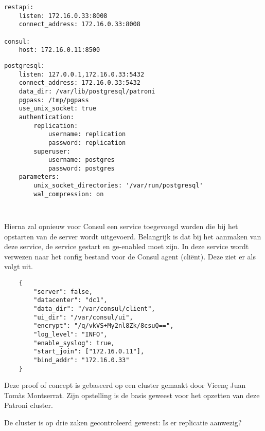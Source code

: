 \begin{lstlisting}
restapi:
    listen: 172.16.0.33:8008
    connect_address: 172.16.0.33:8008

consul:
    host: 172.16.0.11:8500
\end{lstlisting}

\begin{lstlisting}
postgresql:
    listen: 127.0.0.1,172.16.0.33:5432
    connect_address: 172.16.0.33:5432
    data_dir: /var/lib/postgresql/patroni
    pgpass: /tmp/pgpass
    use_unix_socket: true
    authentication:
        replication:
            username: replication
            password: replication
        superuser:
            username: postgres
            password: postgres
    parameters:
        unix_socket_directories: '/var/run/postgresql'
        wal_compression: on
\end{lstlisting}


\begin{lstlisting}
    
\end{lstlisting}




Hierna zal opnieuw voor Consul een service toegevoegd worden die bij het opstarten van de server wordt uitgevoerd. Belangrijk is dat bij het aanmaken van deze service, de service gestart en ge-enabled moet zijn. In deze service wordt verwezen naar het config bestand voor de Consul agent (cliënt). Deze ziet er als volgt uit.

\begin{lstlisting}
    {
        "server": false,
        "datacenter": "dc1",
        "data_dir": "/var/consul/client",
        "ui_dir": "/var/consul/ui",
        "encrypt": "/q/vkVS+My2nl8Zk/8csuQ==", 
        "log_level": "INFO",
        "enable_syslog": true,
        "start_join": ["172.16.0.11"],
        "bind_addr": "172.16.0.33"
    }
\end{lstlisting}



Deze proof of concept is gebaseerd op een cluster gemaakt door Vicenç Juan Tomàs Montserrat. Zijn opstelling is de basis geweest voor het opzetten van deze Patroni cluster.

De cluster is op drie zaken gecontroleerd geweest:
Is er replicatie aanwezig?

